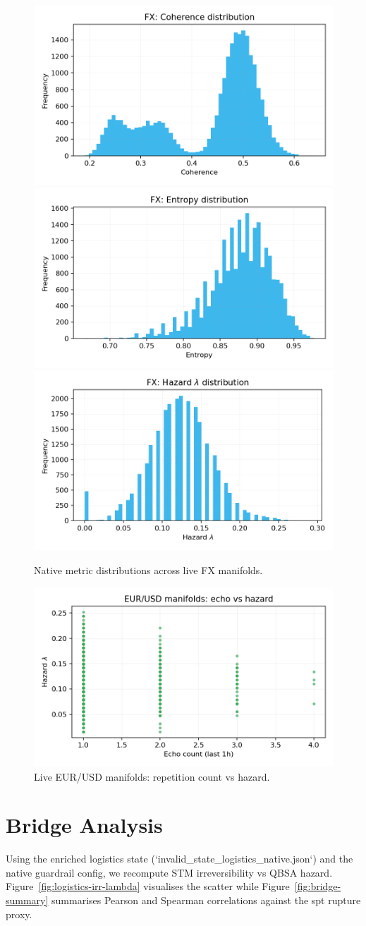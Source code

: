 \documentclass[11pt]{article}
\begin{document}
\begin{figure}[t]
  \centering
  \includegraphics[width=0.32\linewidth]{../figures/fx_metrics/fx_coherence_hist.png}
  \includegraphics[width=0.32\linewidth]{../figures/fx_metrics/fx_entropy_hist.png}
  \includegraphics[width=0.32\linewidth]{../figures/fx_metrics/fx_lambda_hist.png}
  \caption{Native metric distributions across live FX manifolds.}
  \label{fig:fx-metrics}
\end{figure}

\begin{figure}[t]
  \centering
  \includegraphics[width=0.75\linewidth]{../figures/fig2_spt_echo_vs_lambda.png}
  \caption{Live EUR/USD manifolds: repetition count vs hazard.}
  \label{fig:echo-vs-lambda}
\end{figure}

\section{Bridge Analysis}
Using the enriched logistics state (`invalid\_state\_logistics\_native.json`) and the native guardrail config, we recompute STM irreversibility vs QBSA hazard. Figure~\ref{fig:logistics-irr-lambda} visualises the scatter while Figure~\ref{fig:bridge-summary} summarises Pearson and Spearman correlations against the spt rupture proxy.
\end{document}
